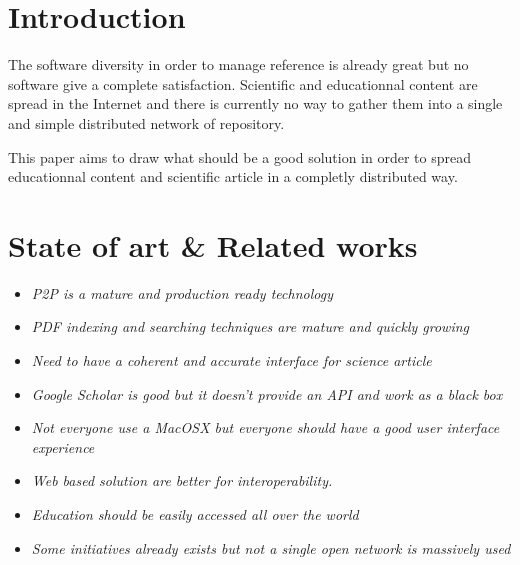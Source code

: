 \section{Introduction}

The software diversity in order to manage reference is already 
great but no software give a complete satisfaction. Scientific and
educationnal content are spread in the Internet and there is currently
no way to gather them into a single and simple distributed network of repository.

This paper aims to draw what should be a good solution in order to 
spread educationnal content and scientific article in a completly distributed 
way.


\section{State of art \& Related works}

\begin{itemize}

\item \textit{P2P is a mature and production ready technology}

\item \textit{PDF indexing and searching techniques are mature and quickly growing}

\item \textit{Need to have a coherent and accurate interface for science article}

\end{itemize}

\begin{itemize}

\item \textit{Google Scholar is good but it doesn't provide an API and work as a black box}

\item \textit{Not everyone use a MacOSX but everyone should have a good user interface experience}

\item \textit{Web based solution are better for interoperability.}

\item \textit{Education should be easily accessed all over the world}

\item \textit{Some initiatives already exists but not a single open network is massively used}

\end{itemize}


